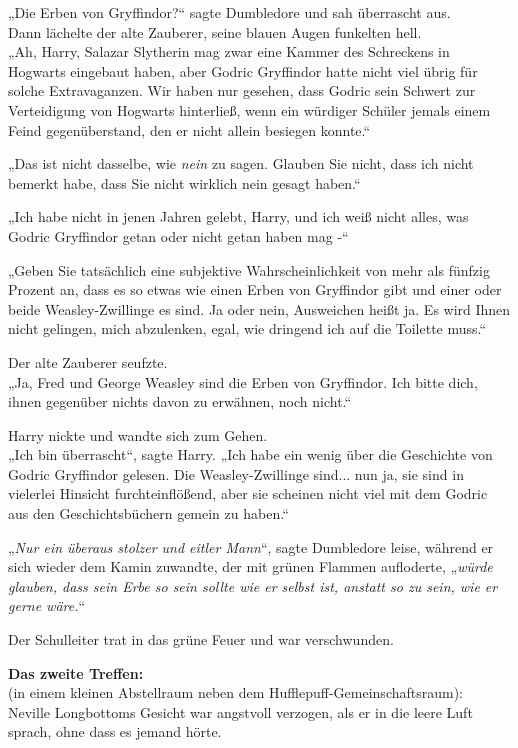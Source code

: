 {„Die Erben von Gryffindor?“ sagte Dumbledore und sah überrascht aus.\\ Dann lächelte der alte Zauberer, seine blauen Augen funkelten hell.\\ „Ah, Harry, Salazar Slytherin mag zwar eine Kammer des Schreckens in Hogwarts eingebaut haben, aber Godric Gryffindor hatte nicht viel übrig für solche Extravaganzen. Wir haben nur gesehen, dass Godric sein Schwert zur Verteidigung von Hogwarts hinterließ, wenn ein würdiger Schüler jemals einem Feind gegenüberstand, den er nicht allein besiegen konnte.“

„Das ist nicht dasselbe, wie \emph{nein} zu sagen. Glauben Sie nicht, dass ich nicht bemerkt habe, dass Sie nicht wirklich nein gesagt haben.“

„Ich habe nicht in jenen Jahren gelebt, Harry, und ich weiß nicht alles, was Godric Gryffindor getan oder nicht getan haben mag -“

„Geben Sie tatsächlich eine subjektive Wahrscheinlichkeit von mehr als fünfzig Prozent an, dass es so etwas wie einen Erben von Gryffindor gibt und einer oder beide Weasley-Zwillinge es sind. Ja oder nein, Ausweichen heißt ja. Es wird Ihnen nicht gelingen, mich abzulenken, egal, wie dringend ich auf die Toilette muss.“

Der alte Zauberer seufzte.\\ „Ja, Fred und George Weasley sind die Erben von Gryffindor. Ich bitte dich, ihnen gegenüber nichts davon zu erwähnen, noch nicht.“

Harry nickte und wandte sich zum Gehen.\\ „Ich bin überrascht“, sagte Harry. „Ich habe ein wenig über die Geschichte von Godric Gryffindor gelesen. Die Weasley-Zwillinge sind... nun ja, sie sind in vielerlei Hinsicht furchteinflößend, aber sie scheinen nicht viel mit dem Godric aus den Geschichtsbüchern gemein zu haben.“

„\emph{Nur ein überaus stolzer und eitler Mann}“, sagte Dumbledore leise, während er sich wieder dem Kamin zuwandte, der mit grünen Flammen aufloderte, „\emph{würde glauben, dass sein Erbe so sein sollte wie er selbst ist, anstatt so zu sein, wie er gerne wäre.}“

Der Schulleiter trat in das grüne Feuer und war verschwunden.

\textbf{Das zweite Treffen:}\\ (in einem kleinen Abstellraum neben dem Hufflepuff-Gemeinschaftsraum):\\ Neville Longbottoms Gesicht war angstvoll verzogen, als er in die leere Luft sprach, ohne dass es jemand hörte.

}

